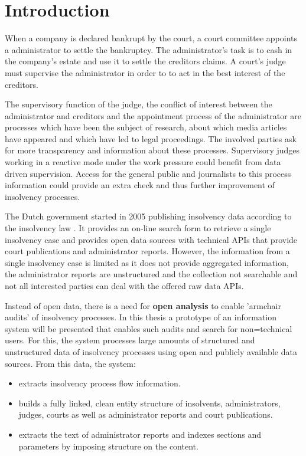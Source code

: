 \section{Introduction}
When a company is declared bankrupt by the court, a court committee appoints a administrator to settle the bankruptcy. The administrator's task is to cash in the company's estate and use it to settle the creditors claims. A court's judge must supervise the administrator in order to to act in the best interest of the creditors.

The supervisory function of the judge, the conflict of interest between the administrator and creditors and the appointment process of the administrator are processes which have been the subject of research\cite{boluk_2011}, about which media articles have appeared \cite{dennis_meneer_2018:1, dennis_meneer_2017:1, jan-hein_strop_2015:1} and which have led to legal proceedings. The involved parties ask for more transparency and information about these processes. Supervisory judges working in a reactive mode under the work pressure could benefit from data driven supervision. Access for the general public and journalists to this process information could provide an extra check and thus further improvement of insolvency processes.

The Dutch government started in 2005 publishing insolvency data\cite{rechtspraak:1} according to the insolvency law \cite{law:1}. It provides an on-line search form to retrieve a single insolvency case and provides open data sources with technical APIs that provide court publications and administrator reports. However, the information from a single insolvency case is limited as it does not provide aggregated information, the administrator reports are unstructured and the collection not searchable and not all interested parties can deal with the offered raw data APIs. 

Instead of open data, there is a need for \textbf{open analysis} to enable 'armchair audits'\cite{o_leary_2015} of insolvency processes. In this thesis a prototype of an information system will be presented that enables such audits and search for non=technical users. For this, the system processes large amounts of structured and unstructured data of insolvency processes using open and publicly available data sources. From this data, the system:
\begin{itemize}
\item extracts insolvency process flow information.
\item builds a fully linked, clean entity structure of insolvents, administrators, judges, courts as well as administrator reports and court publications.
\item extracts the text of administrator reports and indexes sections and parameters by imposing structure on the content.
\end{itemize} 

